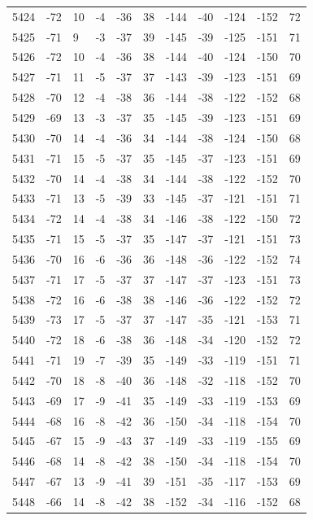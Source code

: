 \begin{table}[H]
\begin{tabular}{lllllllllll}
5424 & -72 & 10 & -4 & -36 & 38 & -144 & -40 & -124 & -152 & 72 \\
5425 & -71 & 9 & -3 & -37 & 39 & -145 & -39 & -125 & -151 & 71 \\
5426 & -72 & 10 & -4 & -36 & 38 & -144 & -40 & -124 & -150 & 70 \\
5427 & -71 & 11 & -5 & -37 & 37 & -143 & -39 & -123 & -151 & 69 \\
5428 & -70 & 12 & -4 & -38 & 36 & -144 & -38 & -122 & -152 & 68 \\
5429 & -69 & 13 & -3 & -37 & 35 & -145 & -39 & -123 & -151 & 69 \\
5430 & -70 & 14 & -4 & -36 & 34 & -144 & -38 & -124 & -150 & 68 \\
5431 & -71 & 15 & -5 & -37 & 35 & -145 & -37 & -123 & -151 & 69 \\
5432 & -70 & 14 & -4 & -38 & 34 & -144 & -38 & -122 & -152 & 70 \\
5433 & -71 & 13 & -5 & -39 & 33 & -145 & -37 & -121 & -151 & 71 \\
5434 & -72 & 14 & -4 & -38 & 34 & -146 & -38 & -122 & -150 & 72 \\
5435 & -71 & 15 & -5 & -37 & 35 & -147 & -37 & -121 & -151 & 73 \\
5436 & -70 & 16 & -6 & -36 & 36 & -148 & -36 & -122 & -152 & 74 \\
5437 & -71 & 17 & -5 & -37 & 37 & -147 & -37 & -123 & -151 & 73 \\
5438 & -72 & 16 & -6 & -38 & 38 & -146 & -36 & -122 & -152 & 72 \\
5439 & -73 & 17 & -5 & -37 & 37 & -147 & -35 & -121 & -153 & 71 \\
5440 & -72 & 18 & -6 & -38 & 36 & -148 & -34 & -120 & -152 & 72 \\
5441 & -71 & 19 & -7 & -39 & 35 & -149 & -33 & -119 & -151 & 71 \\
5442 & -70 & 18 & -8 & -40 & 36 & -148 & -32 & -118 & -152 & 70 \\
5443 & -69 & 17 & -9 & -41 & 35 & -149 & -33 & -119 & -153 & 69 \\
5444 & -68 & 16 & -8 & -42 & 36 & -150 & -34 & -118 & -154 & 70 \\
5445 & -67 & 15 & -9 & -43 & 37 & -149 & -33 & -119 & -155 & 69 \\
5446 & -68 & 14 & -8 & -42 & 38 & -150 & -34 & -118 & -154 & 70 \\
5447 & -67 & 13 & -9 & -41 & 39 & -151 & -35 & -117 & -153 & 69 \\
5448 & -66 & 14 & -8 & -42 & 38 & -152 & -34 & -116 & -152 & 68 \\

\end{tabular}
\end{table}
